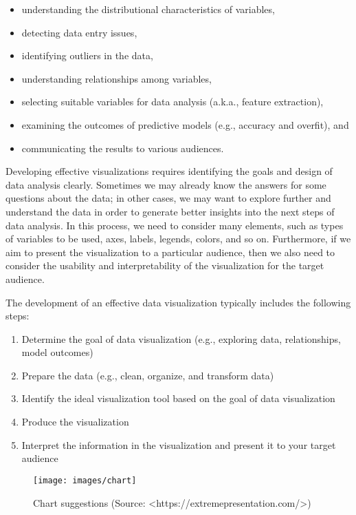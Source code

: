 \documentclass[
]{book}
\providecommand{\tightlist}{%
  \setlength{\itemsep}{0pt}\setlength{\parskip}{0pt}}
\begin{document}
\begin{itemize}
\tightlist
\item
  understanding the distributional characteristics of variables,
\item
  detecting data entry issues,
\item
  identifying outliers in the data,
\item
  understanding relationships among variables,
\item
  selecting suitable variables for data analysis (a.k.a., feature extraction),
\item
  examining the outcomes of predictive models (e.g., accuracy and overfit), and
\item
  communicating the results to various audiences.
\end{itemize}

Developing effective visualizations requires identifying the goals and design of data analysis clearly. Sometimes we may already know the answers for some questions about the data; in other cases, we may want to explore further and understand the data in order to generate better insights into the next steps of data analysis. In this process, we need to consider many elements, such as types of variables to be used, axes, labels, legends, colors, and so on. Furthermore, if we aim to present the visualization to a particular audience, then we also need to consider the usability and interpretability of the visualization for the target audience.

The development of an effective data visualization typically includes the following steps:

\begin{enumerate}
\def\labelenumi{\arabic{enumi}.}
\tightlist
\item
  Determine the goal of data visualization (e.g., exploring data, relationships, model outcomes)
\item
  Prepare the data (e.g., clean, organize, and transform data)
\item
  Identify the ideal visualization tool based on the goal of data visualization
\item
  Produce the visualization
\item
  Interpret the information in the visualization and present it to your target audience
\end{enumerate}

\begin{figure}
\texttt{[image: images/chart]} \caption{Chart suggestions (Source: <https://extremepresentation.com/>)}\label{fig:fig1}
\end{figure}
\end{document}
